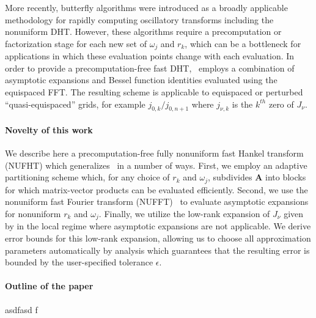 More recently, butterfly algorithms \cite{oneil2010algorithm, li2015butterfly,
  pang2020interpolative} were introduced as a broadly applicable methodology for
rapidly computing oscillatory transforms including the nonuniform DHT. However,
these algorithms require a precomputation or factorization stage for each new
set of $\omega_j$ and $r_k$, which can be a bottleneck for applications in which
these evaluation points change with each evaluation. In order to provide a
precomputation-free fast DHT,~\cite{townsend2015fast} employs a combination of
asymptotic expansions and Bessel function identities evaluated using the
equispaced FFT. The resulting scheme is applicable to equispaced or perturbed
``quasi-equispaced'' grids, for example $j_{0,k} / j_{0,n+1}$ where $j_{\nu,k}$
is the $k^{th}$ zero of $J_\nu$.


\paragraph{Novelty of this work}


We describe here a precomputation-free fully nonuniform fast Hankel transform
(NUFHT) which generalizes~\cite{townsend2015fast} in a number of ways. First, we
employ an adaptive partitioning scheme which, for any choice of $r_k$ and
$\omega_j$, subdivides $\bm{A}$ into blocks for which matrix-vector products can
be evaluated efficiently. Second, we use the nonuniform fast Fourier transform
(NUFFT)~\cite{dutt1993fast, greengard2004accelerating} to evaluate asymptotic
expansions for nonuniform $r_k$ and $\omega_j$. Finally, we utilize the low-rank
expansion of $J_\nu$ given by \cite{wimp1962polynomial} in the local regime
where asymptotic expansions are not applicable. We derive error bounds for this
low-rank expansion, allowing us to choose all approximation parameters
automatically by analysis which guarantees that the resulting error is bounded
by the user-specified tolerance $\epsilon$.



\paragraph{Outline of the paper}

asdfasd
f

